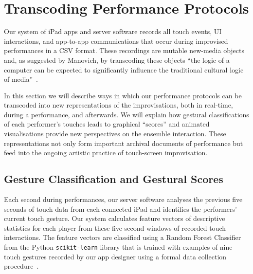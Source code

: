 \documentclass[graybox]{svmult}
\begin{document}
\section{Transcoding Performance Protocols}
\label{sec:analysis}

Our system of iPad apps and server software records all touch events,
UI interactions, and app-to-app communications that occur during
improvised performances in a CSV format. These
recordings are mutable new-media objects and, as suggested by Manovich,
by transcoding these objects ``the logic of a computer can be expected
to significantly influence the traditional cultural logic of
media''~\cite{Manovich:2002ly}.

In this section we will describe ways in which our performance
protocols can be transcoded into new representations of the
improvisations, both in real-time, during a performance, and
afterwards. We will explain how gestural classifications of each
performer's touches leads to graphical ``scores'' and animated
visualisations provide new perspectives on the ensemble interaction.
These representations not only form important archival documents of
performance but feed into the ongoing artistic practice of
touch-screen improvisation.

\subsection{Gesture Classification and Gestural Scores}
\label{subsec:gesture-classification}

Each second during performances, our server software analyses the
previous five seconds of touch-data from each connected iPad and
identifies the performers' current touch gesture. Our system
calculates feature vectors of descriptive statistics for each player
from these five-second windows of recorded touch interactions. The
feature vectors are classified using a Random Forest
Classifier~\cite{Breiman:2001kx} from the Python \texttt{scikit-learn}
library that is trained with examples of nine touch gestures recorded
by our app designer using a formal data collection
procedure~\cite{Martin:2015jk}. 
\end{document}
